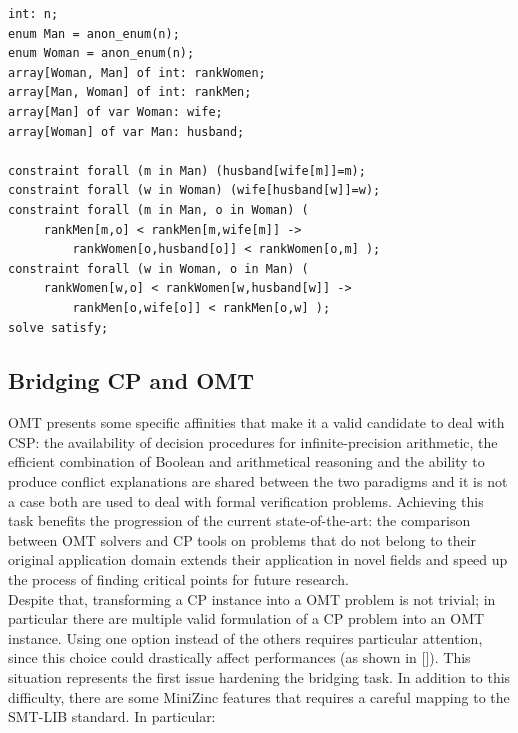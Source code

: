 \begin{lstlisting}[style=interfaces,caption=An example of MiniZinc encoding regarding the popular Stable Marriage Problem.]
int: n;
enum Man = anon_enum(n);
enum Woman = anon_enum(n);
array[Woman, Man] of int: rankWomen;
array[Man, Woman] of int: rankMen;
array[Man] of var Woman: wife;
array[Woman] of var Man: husband;

constraint forall (m in Man) (husband[wife[m]]=m);
constraint forall (w in Woman) (wife[husband[w]]=w);
constraint forall (m in Man, o in Woman) (
     rankMen[m,o] < rankMen[m,wife[m]] -> 
         rankWomen[o,husband[o]] < rankWomen[o,m] );
constraint forall (w in Woman, o in Man) (
     rankWomen[w,o] < rankWomen[w,husband[w]] -> 
         rankMen[o,wife[o]] < rankMen[o,w] );
solve satisfy;
\end{lstlisting}

\subsection{Bridging CP and OMT}

OMT presents some specific affinities that make it a valid candidate to deal with CSP: the availability of decision procedures for infinite-precision arithmetic, the efficient combination of
Boolean and arithmetical reasoning and the ability to produce conflict explanations are shared between the two paradigms and it is not a case both are used to deal with formal verification problems. Achieving this task benefits the progression of the current state-of-the-art: the comparison between OMT solvers and CP tools on problems that do not belong to their original application domain extends their application in novel fields and speed up the process of finding critical points for future research. \\ 
Despite that, transforming a CP instance into a OMT problem is not trivial; in particular there are multiple valid formulation of a CP problem into an OMT instance. Using one option instead of the others requires particular attention, since this choice could drastically affect performances (as shown in []). This situation represents the first issue hardening the bridging task. In addition to this difficulty, there are some MiniZinc features that requires a careful mapping to the SMT-LIB standard. In particular:

